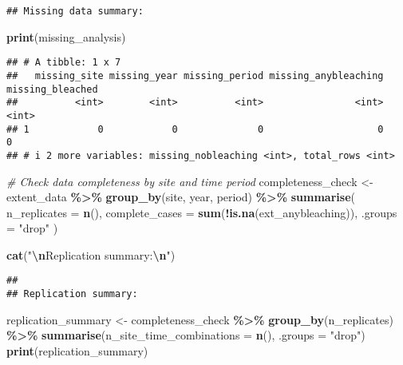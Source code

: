 \documentclass[
]{article}
\newenvironment{Shaded}{\begin{snugshade}}{\end{snugshade}}
\newcommand{\AttributeTok}[1]{\textcolor[rgb]{0.13,0.29,0.53}{#1}}
\newcommand{\CommentTok}[1]{\textcolor[rgb]{0.56,0.35,0.01}{\textit{#1}}}
\newcommand{\FunctionTok}[1]{\textcolor[rgb]{0.13,0.29,0.53}{\textbf{#1}}}
\newcommand{\NormalTok}[1]{#1}
\newcommand{\OtherTok}[1]{\textcolor[rgb]{0.56,0.35,0.01}{#1}}
\newcommand{\SpecialCharTok}[1]{\textcolor[rgb]{0.81,0.36,0.00}{\textbf{#1}}}
\newcommand{\StringTok}[1]{\textcolor[rgb]{0.31,0.60,0.02}{#1}}
\begin{document}
\begin{verbatim}
## Missing data summary:
\end{verbatim}

\begin{Shaded}
\begin{Highlighting}[]
\FunctionTok{print}\NormalTok{(missing\_analysis)}
\end{Highlighting}
\end{Shaded}

\begin{verbatim}
## # A tibble: 1 x 7
##   missing_site missing_year missing_period missing_anybleaching missing_bleached
##          <int>        <int>          <int>                <int>            <int>
## 1            0            0              0                    0                0
## # i 2 more variables: missing_nobleaching <int>, total_rows <int>
\end{verbatim}

\begin{Shaded}
\begin{Highlighting}[]
\CommentTok{\# Check data completeness by site and time period}
\NormalTok{completeness\_check }\OtherTok{\textless{}{-}}\NormalTok{ extent\_data }\SpecialCharTok{\%\textgreater{}\%}
  \FunctionTok{group\_by}\NormalTok{(site, year, period) }\SpecialCharTok{\%\textgreater{}\%}
  \FunctionTok{summarise}\NormalTok{(}
    \AttributeTok{n\_replicates =} \FunctionTok{n}\NormalTok{(),}
    \AttributeTok{complete\_cases =} \FunctionTok{sum}\NormalTok{(}\SpecialCharTok{!}\FunctionTok{is.na}\NormalTok{(ext\_anybleaching)),}
    \AttributeTok{.groups =} \StringTok{"drop"}
\NormalTok{  )}

\FunctionTok{cat}\NormalTok{(}\StringTok{"}\SpecialCharTok{\textbackslash{}n}\StringTok{Replication summary:}\SpecialCharTok{\textbackslash{}n}\StringTok{"}\NormalTok{)}
\end{Highlighting}
\end{Shaded}

\begin{verbatim}
## 
## Replication summary:
\end{verbatim}

\begin{Shaded}
\begin{Highlighting}[]
\NormalTok{replication\_summary }\OtherTok{\textless{}{-}}\NormalTok{ completeness\_check }\SpecialCharTok{\%\textgreater{}\%}
  \FunctionTok{group\_by}\NormalTok{(n\_replicates) }\SpecialCharTok{\%\textgreater{}\%}
  \FunctionTok{summarise}\NormalTok{(}\AttributeTok{n\_site\_time\_combinations =} \FunctionTok{n}\NormalTok{(), }\AttributeTok{.groups =} \StringTok{"drop"}\NormalTok{)}
\FunctionTok{print}\NormalTok{(replication\_summary)}
\end{Highlighting}
\end{Shaded}
\end{document}
